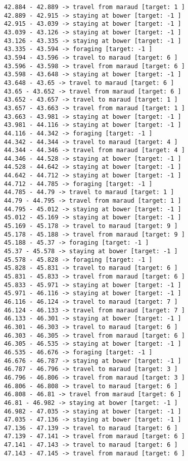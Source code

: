 \documentclass[11pt]{article}
\begin{document}
\begin{Verbatim}[commandchars=\\\{\}]
42.884 - 42.889 -> travel from maraud [target: 1 ]
42.889 - 42.915 -> staying at bower [target: -1 ]
42.915 - 43.039 -> staying at bower [target: -1 ]
43.039 - 43.126 -> staying at bower [target: -1 ]
43.126 - 43.335 -> staying at bower [target: -1 ]
43.335 - 43.594 -> foraging [target: -1 ]
43.594 - 43.596 -> travel to maraud [target: 6 ]
43.596 - 43.598 -> travel from maraud [target: 6 ]
43.598 - 43.648 -> staying at bower [target: -1 ]
43.648 - 43.65 -> travel to maraud [target: 6 ]
43.65 - 43.652 -> travel from maraud [target: 6 ]
43.652 - 43.657 -> travel to maraud [target: 1 ]
43.657 - 43.663 -> travel from maraud [target: 1 ]
43.663 - 43.981 -> staying at bower [target: -1 ]
43.981 - 44.116 -> staying at bower [target: -1 ]
44.116 - 44.342 -> foraging [target: -1 ]
44.342 - 44.344 -> travel to maraud [target: 4 ]
44.344 - 44.346 -> travel from maraud [target: 4 ]
44.346 - 44.528 -> staying at bower [target: -1 ]
44.528 - 44.642 -> staying at bower [target: -1 ]
44.642 - 44.712 -> staying at bower [target: -1 ]
44.712 - 44.785 -> foraging [target: -1 ]
44.785 - 44.79 -> travel to maraud [target: 1 ]
44.79 - 44.795 -> travel from maraud [target: 1 ]
44.795 - 45.012 -> staying at bower [target: -1 ]
45.012 - 45.169 -> staying at bower [target: -1 ]
45.169 - 45.178 -> travel to maraud [target: 9 ]
45.178 - 45.188 -> travel from maraud [target: 9 ]
45.188 - 45.37 -> foraging [target: -1 ]
45.37 - 45.578 -> staying at bower [target: -1 ]
45.578 - 45.828 -> foraging [target: -1 ]
45.828 - 45.831 -> travel to maraud [target: 6 ]
45.831 - 45.833 -> travel from maraud [target: 6 ]
45.833 - 45.971 -> staying at bower [target: -1 ]
45.971 - 46.116 -> staying at bower [target: -1 ]
46.116 - 46.124 -> travel to maraud [target: 7 ]
46.124 - 46.133 -> travel from maraud [target: 7 ]
46.133 - 46.301 -> staying at bower [target: -1 ]
46.301 - 46.303 -> travel to maraud [target: 6 ]
46.303 - 46.305 -> travel from maraud [target: 6 ]
46.305 - 46.535 -> staying at bower [target: -1 ]
46.535 - 46.676 -> foraging [target: -1 ]
46.676 - 46.787 -> staying at bower [target: -1 ]
46.787 - 46.796 -> travel to maraud [target: 3 ]
46.796 - 46.806 -> travel from maraud [target: 3 ]
46.806 - 46.808 -> travel to maraud [target: 6 ]
46.808 - 46.81 -> travel from maraud [target: 6 ]
46.81 - 46.982 -> staying at bower [target: -1 ]
46.982 - 47.035 -> staying at bower [target: -1 ]
47.035 - 47.136 -> staying at bower [target: -1 ]
47.136 - 47.139 -> travel to maraud [target: 6 ]
47.139 - 47.141 -> travel from maraud [target: 6 ]
47.141 - 47.143 -> travel to maraud [target: 6 ]
47.143 - 47.145 -> travel from maraud [target: 6 ]

\end{Verbatim}
\end{document}
